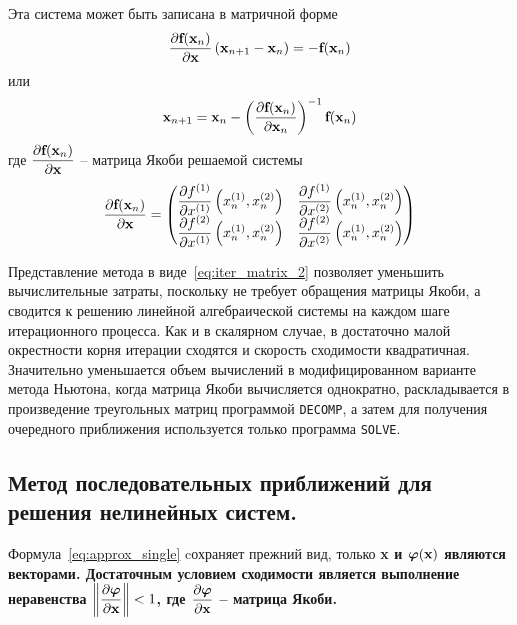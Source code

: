 Эта система может быть записана в матричной форме
\begin{equation}
    \frac{\partial \bf{f}(\bf{x}_n)}{\partial \bf{x}} \left( \bf{x}_{n+1} - \bf{x}_n \right) = -\bf{f}(\bf{x}_n) \label{eq:iter_matrix_1}
\end{equation}
или
\begin{equation}
    \bf{x}_{n+1} = \bf{x}_n - \left( \frac{\partial \bf{f}(\bf{x}_n)}{\partial \bf{x}_n} \right)^{-1} \bf{f}(\bf{x}_n) \label{eq:iter_matrix_2}
\end{equation}
где $\displaystyle \frac{\partial \bf{f}(\bf{x}_n)}{\partial \bf{x}}$ -- матрица Якоби решаемой системы
\begin{equation*}
    \frac{\partial \bf{f}(\bf{x}_n)}{\partial \bf{x}} =
    \begin{pmatrix}
        \displaystyle \frac{\partial f^{(1)}}{\partial x^{(1)}}\left( x_n^{(1)}, x_n^{(2)} \right) & \displaystyle \frac{\partial f^{(1)}}{\partial x^{(2)}}\left( x_n^{(1)}, x_n^{(2)} \right) \\
        \displaystyle \frac{\partial f^{(2)}}{\partial x^{(1)}}\left( x_n^{(1)}, x_n^{(2)} \right) & \displaystyle \frac{\partial f^{(2)}}{\partial x^{(2)}}\left( x_n^{(1)}, x_n^{(2)} \right)
    \end{pmatrix}
\end{equation*}

Представление метода в виде~\eqref{eq:iter_matrix_2} позволяет уменьшить вычислительные затраты, поскольку не требует
обращения матрицы Якоби, а сводится к решению линейной алгебраической системы на каждом шаге итерационного процесса.
Как и в скалярном случае, в достаточно малой окрестности корня итерации сходятся и скорость сходимости квадратичная.
Значительно уменьшается объем вычислений в модифицированном варианте метода Ньютона, когда матрица Якоби вычисляется
однократно, раскладывается в произведение треугольных матриц программой \verb|DECOMP|, а затем для получения очередного
приближения используется только программа \verb|SOLVE|.

\subsection{Метод последовательных приближений для решения нелинейных систем.}
Формула~\eqref{eq:approx_single} cохраняет прежний вид, только \bf{x} и $\bm{\varphi}(\bf{x})$ являются векторами.
Достаточным условием сходимости является выполнение неравенства $\displaystyle \left\| \frac{\partial \bm{\varphi}}{\partial \bf{x}} \right\| < 1$,
где $\displaystyle \frac{\partial \bm{\varphi}}{\partial \bf{x}}$ -- матрица Якоби.
